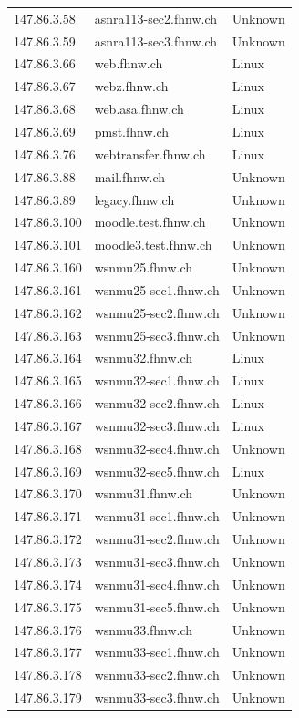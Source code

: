 \documentclass[a4paper,11pt]{scrartcl}
\begin{document}
\begin{longtable}{p{2.5cm}|p{8cm}|l}
	147.86.3.58 & asnra113-sec2.fhnw.ch & Unknown\\
	147.86.3.59 & asnra113-sec3.fhnw.ch & Unknown\\
	147.86.3.66 & web.fhnw.ch & Linux\\
	147.86.3.67 & webz.fhnw.ch & Linux\\
	147.86.3.68 & web.asa.fhnw.ch & Linux\\
	147.86.3.69 & pmst.fhnw.ch & Linux\\
	147.86.3.76 & webtransfer.fhnw.ch & Linux\\
	147.86.3.88 & mail.fhnw.ch & Unknown\\
	147.86.3.89 & legacy.fhnw.ch & Unknown\\
	147.86.3.100 & moodle.test.fhnw.ch & Unknown\\
	147.86.3.101 & moodle3.test.fhnw.ch & Unknown\\
	147.86.3.160 & wsnmu25.fhnw.ch & Unknown\\
	147.86.3.161 & wsnmu25-sec1.fhnw.ch & Unknown\\
	147.86.3.162 & wsnmu25-sec2.fhnw.ch & Unknown\\
	147.86.3.163 & wsnmu25-sec3.fhnw.ch & Unknown\\
	147.86.3.164 & wsnmu32.fhnw.ch & Linux\\
	147.86.3.165 & wsnmu32-sec1.fhnw.ch & Linux\\
	147.86.3.166 & wsnmu32-sec2.fhnw.ch & Linux\\
	147.86.3.167 & wsnmu32-sec3.fhnw.ch & Linux\\
	147.86.3.168 & wsnmu32-sec4.fhnw.ch & Unknown\\
	147.86.3.169 & wsnmu32-sec5.fhnw.ch & Linux\\
	147.86.3.170 & wsnmu31.fhnw.ch & Unknown\\
	147.86.3.171 & wsnmu31-sec1.fhnw.ch & Unknown\\
	147.86.3.172 & wsnmu31-sec2.fhnw.ch & Unknown\\
	147.86.3.173 & wsnmu31-sec3.fhnw.ch & Unknown\\
	147.86.3.174 & wsnmu31-sec4.fhnw.ch & Unknown\\
	147.86.3.175 & wsnmu31-sec5.fhnw.ch & Unknown\\
	147.86.3.176 & wsnmu33.fhnw.ch & Unknown\\
	147.86.3.177 & wsnmu33-sec1.fhnw.ch & Unknown\\
	147.86.3.178 & wsnmu33-sec2.fhnw.ch & Unknown\\
	147.86.3.179 & wsnmu33-sec3.fhnw.ch & Unknown\\

\end{longtable}
\end{document}
